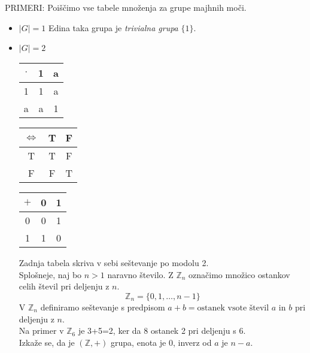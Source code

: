 \documentclass[a4paper,12pt]{article}
\begin{document}
\noindent PRIMERI: Poiščimo vse tabele množenja za grupe majhnih moči.
\begin{itemize}
\item $|G|=1$ Edina taka grupa je \textit{trivialna grupa} $\{ 1 \}$.
\item $|G|=2$

\begin{table}[hbp]
\begin{minipage}[b]{0.30\linewidth}\centering
\begin{tabular}{c|cc}
$\cdot$ & 1 & a \\
\hline
1 & 1 & a \\
a & a & 1 \\
\end{tabular}
\end{minipage}
\hspace{0.5cm}
\begin{minipage}[b]{0.30\linewidth}\centering
\begin{tabular}{c|cc}
$\Leftrightarrow$ & T & F \\
\hline
T & T & F \\
F & F & T \\
\end{tabular}
\end{minipage}
\hspace{0.5cm}
\begin{minipage}[b]{0.30\linewidth}\centering
\begin{tabular}{c|cc}
$+$ & 0 & 1 \\
\hline
0 & 0 & 1 \\
1 & 1 & 0 \\
\end{tabular}
\end{minipage}
\end{table}

Zadnja tabela skriva v sebi seštevanje po modolu 2. \\

Splošneje, naj bo $n>1$ naravno število. Z $\mathbb{Z}_n$ označimo množico ostankov celih števil pri deljenju z $n$. 
$$ \mathbb{Z}_n=\{ 0,1,\ldots,n-1 \}$$
V $\mathbb{Z}_n$ definiramo seštevanje s predpisom $a+b=\text{ostanek vsote števil $a$ in $b$}$ pri deljenju z $n$. \\

Na primer v $\mathbb{Z}_6$ je 3+5=2, ker da 8 ostanek 2 pri deljenju s 6. \\

Izkaže se, da je $(\mathbb{Z},+)$ grupa, enota je 0, inverz od $a$ je $n-a$. \\


\end{itemize}
\end{document}
